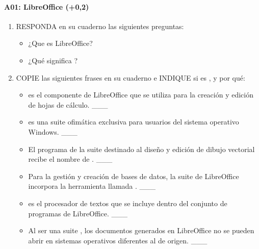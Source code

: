 \documentclass[letterpaper,10pt,spanish]{sphinxmanual}
\begin{document}
\paragraph{A01: LibreOffice (+0,2)}
\label{\detokenize{cursos/ofimatica10/periodo01/G03:a01-libreoffice-0-2}}
\sphinxAtStartPar
{}
\begin{enumerate}
%
\item {} 
\sphinxAtStartPar
RESPONDA en su cuaderno las siguientes preguntas:
\begin{itemize}
\item {} 
\sphinxAtStartPar
¿Que es LibreOffice?

\item {} 
\sphinxAtStartPar
¿Qué significa ?

\end{itemize}

\item {} 
\sphinxAtStartPar
COPIE las siguientes frases en su cuaderno e INDIQUE si es ,  y por qué:
\begin{itemize}
\item {} 
\sphinxAtStartPar
{} es el componente de LibreOffice que se utiliza para la creación y edición de hojas de cálculo. \_\_\_

\item {} 
\sphinxAtStartPar
{} es una suite ofimática exclusiva para usuarios del sistema operativo Windows. \_\_\_

\item {} 
\sphinxAtStartPar
El programa de la suite destinado al diseño y edición de dibujo vectorial recibe el nombre de . \_\_\_

\item {} 
\sphinxAtStartPar
Para la gestión y creación de bases de datos, la suite de LibreOffice incorpora la herramienta llamada . \_\_\_

\item {} 
\sphinxAtStartPar
{} es el procesador de textos que se incluye dentro del conjunto de programas de LibreOffice. \_\_\_

\item {} 
\sphinxAtStartPar
Al ser una suite , los documentos generados en LibreOffice no se pueden abrir en sistemas operativos
diferentes al de origen. \_\_\_


\end{itemize}
\end{enumerate}
\end{document}
